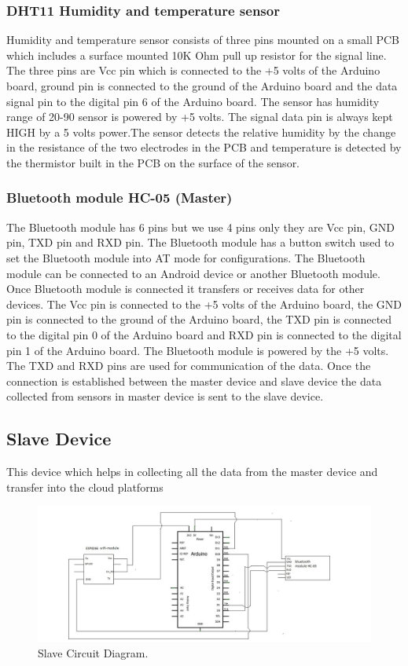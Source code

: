 \subsubsection{DHT11 Humidity and temperature sensor}
Humidity and temperature sensor consists of three pins mounted on a small PCB which includes a surface mounted 10K Ohm pull up resistor for the signal line. The three pins are Vcc pin which is connected to the +5 volts of the Arduino board, ground pin is connected to the ground of the Arduino board and the data signal pin to the digital pin 6 of the Arduino board. The sensor has humidity range of 20-90%
sensor is powered by +5 volts. The signal data pin is always kept HIGH by a 5 volts power.The sensor detects the relative humidity by the change in the resistance of the two electrodes in the PCB and temperature is detected by the thermistor built in the PCB on the surface of the sensor.
\subsubsection{Bluetooth module HC-05 (Master)}
The Bluetooth module has 6 pins but we use 4 pins only they are Vcc pin, GND pin, TXD pin and RXD pin. The Bluetooth module has a button switch used to set the Bluetooth module into AT mode for configurations. The Bluetooth module can be connected to an Android device or another Bluetooth module. Once Bluetooth module is connected it transfers or receives data for other devices. The Vcc pin is connected to the +5 volts of the Arduino board, the GND pin is connected to the ground of the Arduino board, the TXD pin is
connected to the digital pin 0 of the Arduino board and RXD pin is connected to the digital pin 1 of the Arduino board. The Bluetooth module is powered by the +5 volts. The TXD and RXD pins are used for communication of the data. Once the connection is established between the master device and slave device the data collected from sensors in master device is sent to the slave device.
\subsection{Slave Device}
This device which helps in collecting all the data from the master device and transfer into the cloud platforms 
\begin{figure}[h]
\centerline{\includegraphics[width=5.7in]{SC}}
\caption{ Slave Circuit Diagram.}
\end{figure}
